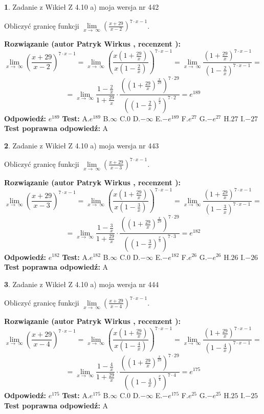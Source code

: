\documentclass[12pt, a4paper]{article}
\theoremstyle{definition} %
\newtheorem{zad}{}
\newcommand{\zadStart}[1]{\begin{zad}#1\newline}
\newcommand{\zadStop}{\end{zad}}
\newcommand{\rozwStart}[2]{\noindent \textbf{Rozwiązanie (autor #1 , recenzent #2): }\newline}
\newcommand{\rozwStop}{\newline}
\newcommand{\odpStart}{\noindent \textbf{Odpowiedź:}\newline}
\newcommand{\odpStop}{\newline}
\newcommand{\testStart}{\noindent \textbf{Test:}\newline}
\newcommand{\testStop}{\newline}
\newcommand{\kluczStart}{\noindent \textbf{Test poprawna odpowiedź:}\newline}
\newcommand{\kluczStop}{\newline}
\begin{document}
\zadStart{Zadanie z Wikieł Z 4.10 a) moja wersja nr 442}

Obliczyć granicę funkcji  $\lim\limits_{x\to\ \infty}(\frac{x+29}{x-2})^{7\cdot x-1}$.
\zadStop
\rozwStart{Patryk Wirkus}{}
$$\lim\limits_{x\to\ \infty}(\frac{x+29}{x-2})^{7\cdot x-1} = \lim\limits_{x\to\ \infty}(\frac{x(1+\frac{29}{x})}{x(1-\frac{2}{x})})^{7\cdot x-1}=\lim\limits_{x\to\ \infty}\frac{(1+\frac{29}{x})^{7\cdot x-1}}{(1-\frac{2}{x})^{7\cdot x-1}}=$$
$$=\lim\limits_{x\to\ \infty}\frac{1-\frac{2}{x}}{1+\frac{29}{x}}\cdot\frac{((1+\frac{29}{x})^{\frac{x}{29}})^{7\cdot29}}{((1-\frac{2}{x})^{\frac{x}{2}})^{7\cdot2}}=e^{189}$$
\rozwStop
\odpStart
$e^{189}$
\odpStop
\testStart
A.$e^{189}$ B.$\infty$ C.$0$ D.$-\infty$ E.$-e^{189}$
F.$e^{27}$ G.$-e^{27}$
H.$27$
I.$-27$
\testStop
\kluczStart
A
\kluczStop



\zadStart{Zadanie z Wikieł Z 4.10 a) moja wersja nr 443}

Obliczyć granicę funkcji  $\lim\limits_{x\to\ \infty}(\frac{x+29}{x-3})^{7\cdot x-1}$.
\zadStop
\rozwStart{Patryk Wirkus}{}
$$\lim\limits_{x\to\ \infty}(\frac{x+29}{x-3})^{7\cdot x-1} = \lim\limits_{x\to\ \infty}(\frac{x(1+\frac{29}{x})}{x(1-\frac{3}{x})})^{7\cdot x-1}=\lim\limits_{x\to\ \infty}\frac{(1+\frac{29}{x})^{7\cdot x-1}}{(1-\frac{3}{x})^{7\cdot x-1}}=$$
$$=\lim\limits_{x\to\ \infty}\frac{1-\frac{3}{x}}{1+\frac{29}{x}}\cdot\frac{((1+\frac{29}{x})^{\frac{x}{29}})^{7\cdot29}}{((1-\frac{3}{x})^{\frac{x}{3}})^{7\cdot3}}=e^{182}$$
\rozwStop
\odpStart
$e^{182}$
\odpStop
\testStart
A.$e^{182}$ B.$\infty$ C.$0$ D.$-\infty$ E.$-e^{182}$
F.$e^{26}$ G.$-e^{26}$
H.$26$
I.$-26$
\testStop
\kluczStart
A
\kluczStop



\zadStart{Zadanie z Wikieł Z 4.10 a) moja wersja nr 444}

Obliczyć granicę funkcji  $\lim\limits_{x\to\ \infty}(\frac{x+29}{x-4})^{7\cdot x-1}$.
\zadStop
\rozwStart{Patryk Wirkus}{}
$$\lim\limits_{x\to\ \infty}(\frac{x+29}{x-4})^{7\cdot x-1} = \lim\limits_{x\to\ \infty}(\frac{x(1+\frac{29}{x})}{x(1-\frac{4}{x})})^{7\cdot x-1}=\lim\limits_{x\to\ \infty}\frac{(1+\frac{29}{x})^{7\cdot x-1}}{(1-\frac{4}{x})^{7\cdot x-1}}=$$
$$=\lim\limits_{x\to\ \infty}\frac{1-\frac{4}{x}}{1+\frac{29}{x}}\cdot\frac{((1+\frac{29}{x})^{\frac{x}{29}})^{7\cdot29}}{((1-\frac{4}{x})^{\frac{x}{4}})^{7\cdot4}}=e^{175}$$
\rozwStop
\odpStart
$e^{175}$
\odpStop
\testStart
A.$e^{175}$ B.$\infty$ C.$0$ D.$-\infty$ E.$-e^{175}$
F.$e^{25}$ G.$-e^{25}$
H.$25$
I.$-25$
\testStop
\kluczStart
A
\kluczStop
\end{document}
